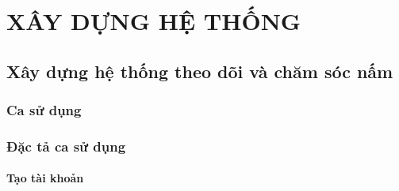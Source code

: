 \chapter{XÂY DỰNG HỆ THỐNG}
\section{Xây dựng hệ thống theo dõi và chăm sóc nấm}
\subsection{Ca sử dụng}
\subsection{Đặc tả ca sử dụng}
\subsubsection{Tạo tài khoản}
	
